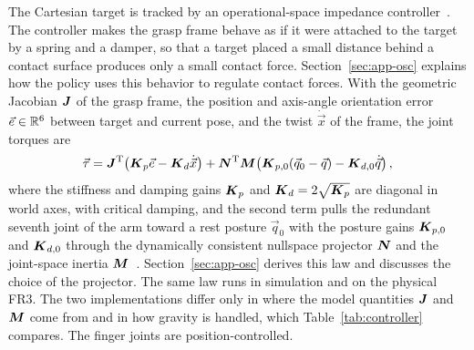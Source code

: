 The Cartesian target is tracked by an operational-space impedance controller~\cite{Khatib1987,Villani2016}. The controller makes the grasp frame behave as if it were attached to the target by a spring and a damper, so that a target placed a small distance behind a contact surface produces only a small contact force. Section~\ref{sec:app-osc} explains how the policy uses this behavior to regulate contact forces. With the geometric Jacobian $\boldsymbol{J}$ of the grasp frame, the position and axis-angle orientation error $\vec{e}\in\mathbb{R}^{6}$ between target and current pose, and the twist $\dot{\vec{x}}$ of the frame, the joint torques are
\begin{equation}\label{eq:osc}
  \vec{\tau}=\boldsymbol{J}^{\mathrm{T}}\!\left(\boldsymbol{K}_p\vec{e}-\boldsymbol{K}_d\dot{\vec{x}}\right)+\boldsymbol{N}^{\mathrm{T}}\boldsymbol{M}\!\left(\boldsymbol{K}_{p,0}(\vec{q}_0-\vec{q})-\boldsymbol{K}_{d,0}\dot{\vec{q}}\right),
\end{equation}
where the stiffness and damping gains $\boldsymbol{K}_p$ and $\boldsymbol{K}_d=2\sqrt{\boldsymbol{K}_p}$ are diagonal in world axes, with critical damping, and the second term pulls the redundant seventh joint of the arm toward a rest posture $\vec{q}_0$ with the posture gains $\boldsymbol{K}_{p,0}$ and $\boldsymbol{K}_{d,0}$ through the dynamically consistent nullspace projector $\boldsymbol{N}$ and the joint-space inertia $\boldsymbol{M}$~\cite{Dietrich2015,RoboticSystemsLab2019}. Section~\ref{sec:app-osc} derives this law and discusses the choice of the projector. The same law runs in simulation and on the physical \ac{FR3}. The two implementations differ only in where the model quantities $\boldsymbol{J}$ and $\boldsymbol{M}$ come from and in how gravity is handled, which Table~\ref{tab:controller} compares. The finger joints are position-controlled.
